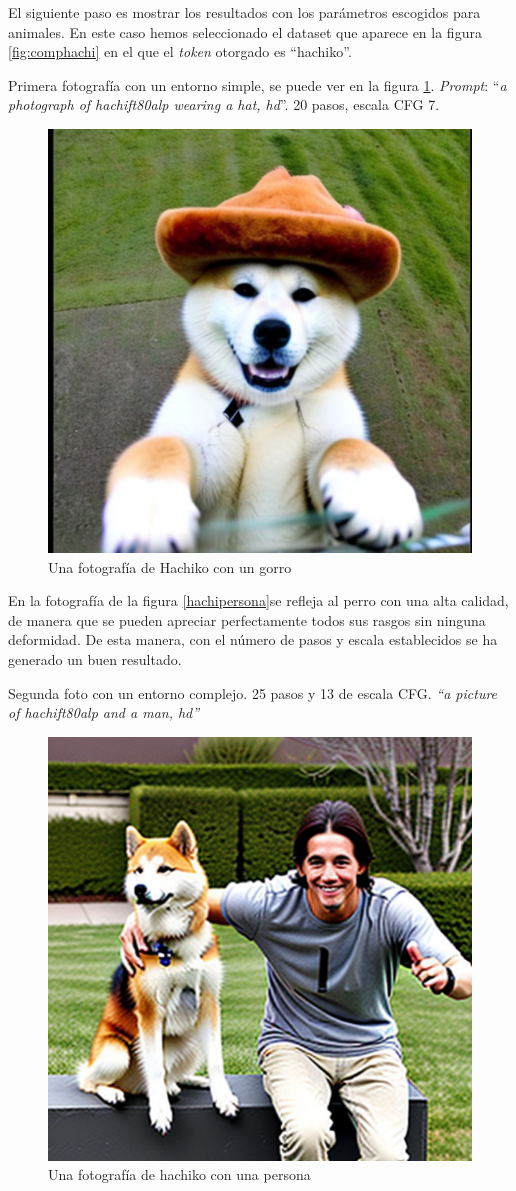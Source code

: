 El siguiente paso es mostrar los resultados con los parámetros escogidos para animales. En este caso hemos seleccionado el dataset que aparece en la figura \ref{fig:comphachi} en el que el \textit{token} otorgado es ``hachiko''.

Primera fotografía con un entorno simple, se puede ver en la figura \ref{fig:hachigorrito}. \textit{Prompt}: ``\textit{a photograph of hachift80alp wearing a hat, hd}''. 20 pasos, escala CFG 7.


\begin{figure}[!htb]
	\centering
	\includegraphics[width = 0.5
	\textwidth]{Imagenes/Vectorial/hachigorrito.png}
	\caption{Una fotografía de Hachiko con un gorro}
	\label{fig:hachigorrito}
\end{figure}

En la fotografía de la figura \ref{hachipersona}se refleja al perro con una alta calidad, de manera que se pueden apreciar perfectamente todos sus rasgos sin ninguna deformidad. De esta manera, con el número de pasos y escala establecidos se ha generado un buen resultado.

Segunda foto con un entorno complejo. 25 pasos y 13 de escala CFG.
\textit{``a picture of hachift80alp and a man, hd''}

\begin{figure}[!htb]
	\centering
	\includegraphics[width = 0.5
	\textwidth]{Imagenes/Vectorial/hachiconpersona.png}
	\caption{Una fotografía de hachiko con una persona}
	\label{fig:hachipersona}
\end{figure}

